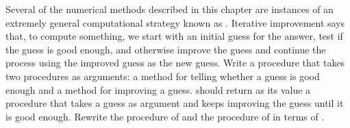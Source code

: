 \begin{exerciseGroup}
\label{Exercise 1.46}
 Several of the numerical methods
described in this chapter are instances of an extremely general computational
strategy known as .  Iterative improvement says
that, to compute something, we start with an initial guess for the answer, test
if the guess is good enough, and otherwise improve the guess and continue the
process using the improved guess as the new guess.  Write a procedure
 that takes two procedures as arguments: a method for
telling whether a guess is good enough and a method for improving a guess.
 should return as its value a procedure that takes a
guess as argument and keeps improving the guess until it is good enough.
Rewrite the  procedure of  and the
 procedure of  in terms of
.
\end{exerciseGroup}
